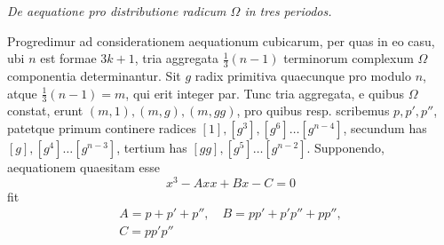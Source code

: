 \begin{center}\itshape \textit{De aequatione pro distributione radicum \(\Omega\) in tres periodos.}\end{center}


Progredimur ad considerationem aequationum cubicarum, per quas in eo casu, ubi \(n\) est formae \(3k+1\), tria aggregata \(\frac13(n-1)\) terminorum complexum \(\Omega\) componentia determinantur. Sit \(g\) radix primitiva quaecunque pro modulo \(n\), atque \(\frac13(n-1)=m\), qui erit integer par. Tunc tria aggregata, e quibus \(\Omega\) constat, erunt \((m,1),\allowbreak (m,g),\allowbreak (m,gg)\), pro quibus resp. scribemus \(p,\allowbreak p',\allowbreak p''\), patetque primum continere radices \([1],\allowbreak [g^3],\allowbreak [g^6]\ldots[g^{n-4}]\), secundum has \([g],\allowbreak [g^4]\ldots[g^{n-3}]\), tertium has \([gg],\allowbreak [g^5]\ldots[g^{n-2}]\). Supponendo, aequationem quaesitam esse \[x^3-Axx+Bx-C=0\] fit \[\begin{gathered}A=p+p'+p'',\quad B=pp'+p'p''+pp'',\\C=pp'p''\end{gathered}\]

